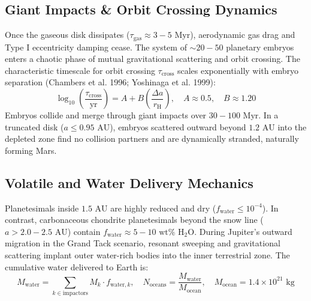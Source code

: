 \documentclass[11pt,a4paper]{article}
\begin{document}
\subsection{Giant Impacts \& Orbit Crossing Dynamics}
Once the gaseous disk dissipates ($\tau_{\text{gas}} \approx 3-5\text{ Myr}$), aerodynamic gas drag and Type I eccentricity damping cease. The system of $\sim 20-50$ planetary embryos enters a chaotic phase of mutual gravitational scattering and orbit crossing. The characteristic timescale for orbit crossing $\tau_{\text{cross}}$ scales exponentially with embryo separation (Chambers et al. 1996; Yoshinaga et al. 1999):
\begin{equation}
\log_{10}\left(\frac{\tau_{\text{cross}}}{\text{yr}}\right) = A + B \left(\frac{\Delta a}{r_{\text{H}}}\right), \quad A \approx 0.5, \quad B \approx 1.20
\end{equation}
Embryos collide and merge through giant impacts over $30-100\text{ Myr}$. In a truncated disk ($a \le 0.95\text{ AU}$), embryos scattered outward beyond $1.2\text{ AU}$ into the depleted zone find no collision partners and are dynamically stranded, naturally forming Mars.

\subsection{Volatile and Water Delivery Mechanics}
Planetesimals inside $1.5\text{ AU}$ are highly reduced and dry ($f_{\text{water}} \le 10^{-4}$). In contrast, carbonaceous chondrite planetesimals beyond the snow line ($a > 2.0-2.5\text{ AU}$) contain $f_{\text{water}} \approx 5-10\text{ wt}\%\text{ H}_2\text{O}$. During Jupiter's outward migration in the Grand Tack scenario, resonant sweeping and gravitational scattering implant outer water-rich bodies into the inner terrestrial zone. The cumulative water delivered to Earth is:
\begin{equation}
M_{\text{water}} = \sum_{k \in \text{impactors}} M_k \cdot f_{\text{water}, k}, \quad N_{\text{oceans}} = \frac{M_{\text{water}}}{M_{\text{ocean}}}, \quad M_{\text{ocean}} = 1.4 \times 10^{21}\text{ kg}
\end{equation}
\end{document}
